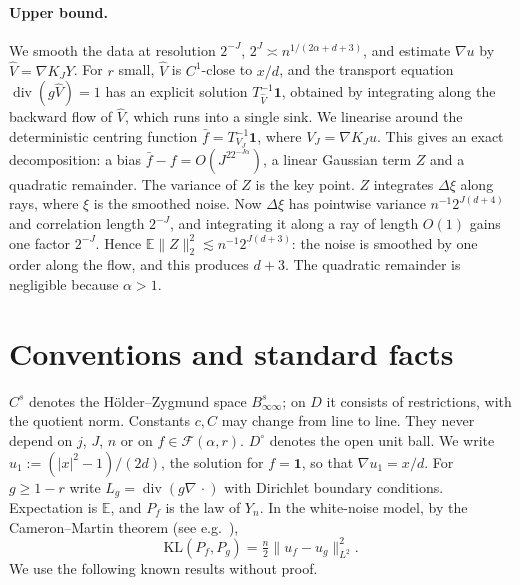 \documentclass[11pt]{article}
\theoremstyle{definition}
\theoremstyle{remark}
\newcommand{\E}{\mathbb E}
\newcommand{\one}{\mathbf 1}
\newcommand{\Fc}{\mathcal F}
\newcommand{\dv}{\operatorname{div}}
\newcommand{\KL}{\mathrm{KL}}
\newcommand{\Dint}{D^{\circ}}
\begin{document}
\paragraph{Upper bound.} We smooth the data at resolution $2^{-J}$, $2^J\asymp n^{1/(2\alpha+d+3)}$, and estimate $\nabla u$ by $\hat V=\nabla K_JY$. For $r$ small, $\hat V$ is $C^1$-close to $x/d$, and the transport equation $\dv(g\hat V)=1$ has an explicit solution $T^{-1}_{\hat V}\one$, obtained by integrating along the backward flow of $\hat V$, which runs into a single sink. We linearise around the deterministic centring function $\bar f=T^{-1}_{V_J}\one$, where $V_J=\nabla K_Ju$. This gives an exact decomposition: a bias $\bar f-f=O(J^22^{-J\alpha})$, a linear Gaussian term $Z$ and a quadratic remainder. The variance of $Z$ is the key point. $Z$ integrates $\Delta\xi$ along rays, where $\xi$ is the smoothed noise. Now $\Delta\xi$ has pointwise variance $n^{-1}2^{J(d+4)}$ and correlation length $2^{-J}$, and integrating it along a ray of length $O(1)$ gains one factor $2^{-J}$. Hence $\E\|Z\|_2^2\lesssim n^{-1}2^{J(d+3)}$: the noise is smoothed by one order along the flow, and this produces $d+3$. The quadratic remainder is negligible because $\alpha>1$.

\section{Conventions and standard facts}\label{sec:facts}

$C^s$ denotes the H\"older--Zygmund space $B^s_{\infty\infty}$; on $D$ it consists of restrictions, with the quotient norm. Constants $c,C$ may change from line to line. They never depend on $j$, $J$, $n$ or on $f\in\Fc(\alpha,r)$. $\Dint$ denotes the open unit ball. We write $u_1:=(|x|^2-1)/(2d)$, the solution for $f=\one$, so that $\nabla u_1=x/d$. For $g\ge 1-r$ write $L_g=\dv(g\nabla\,\cdot)$ with Dirichlet boundary conditions. Expectation is $\E$, and $P_f$ is the law of $Y_n$. In the white-noise model, by the Cameron--Martin theorem (see e.g.\ \cite{GN16}),
\[
\KL(P_f,P_g)=\tfrac n2\|u_f-u_g\|_{L^2}^2 .
\]
We use the following known results without proof.
\end{document}
